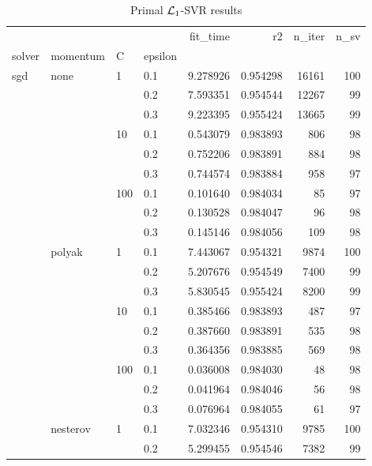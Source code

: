 \begin{table}[H]
\centering
\caption{Primal $\protect \mathcal{L}_1$-SVR results}
\label{primal_l1_svr_cv_results}
\begin{tabular}{llllrrrr}
\toprule
          &   &     &     &  fit\_time &        r2 &  n\_iter &  n\_sv \\
solver & momentum & C & epsilon &           &           &         &       \\
\midrule
sgd & none & 1   & 0.1 &  9.278926 &  0.954298 &   16161 &   100 \\
          &   &     & 0.2 &  7.593351 &  0.954544 &   12267 &    99 \\
          &   &     & 0.3 &  9.223395 &  0.955424 &   13665 &    99 \\
          &   & 10  & 0.1 &  0.543079 &  0.983893 &     806 &    98 \\
          &   &     & 0.2 &  0.752206 &  0.983891 &     884 &    98 \\
          &   &     & 0.3 &  0.744574 &  0.983884 &     958 &    97 \\
          &   & 100 & 0.1 &  0.101640 &  0.984034 &      85 &    97 \\
          &   &     & 0.2 &  0.130528 &  0.984047 &      96 &    98 \\
          &   &     & 0.3 &  0.145146 &  0.984056 &     109 &    98 \\
          & polyak & 1   & 0.1 &  7.443067 &  0.954321 &    9874 &   100 \\
          &   &     & 0.2 &  5.207676 &  0.954549 &    7400 &    99 \\
          &   &     & 0.3 &  5.830545 &  0.955424 &    8200 &    99 \\
          &   & 10  & 0.1 &  0.385466 &  0.983893 &     487 &    97 \\
          &   &     & 0.2 &  0.387660 &  0.983891 &     535 &    98 \\
          &   &     & 0.3 &  0.364356 &  0.983885 &     569 &    98 \\
          &   & 100 & 0.1 &  0.036008 &  0.984030 &      48 &    98 \\
          &   &     & 0.2 &  0.041964 &  0.984046 &      56 &    98 \\
          &   &     & 0.3 &  0.076964 &  0.984055 &      61 &    97 \\
          & nesterov & 1   & 0.1 &  7.032346 &  0.954310 &    9785 &   100 \\
          &   &     & 0.2 &  5.299455 &  0.954546 &    7382 &    99 \\

\end{tabular}
\end{table}
